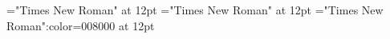 \documentclass[a4paper]{article}
\begin{document}
 
\pagestyle{plain} 
\font\ta="Times New Roman" at 12pt
\font\tbta="Times New Roman" at 12pt
\font\tctbta="Times New Roman":color=008000 at 12pt

\pagestyle{fancy} 





\end{document}
